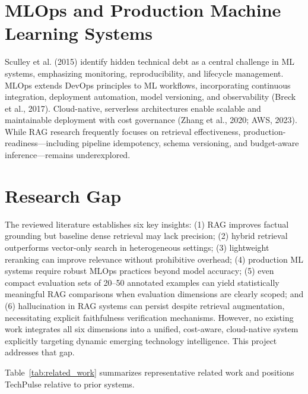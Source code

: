 \documentclass[12pt,a4paper]{report}
\begin{document}
\section{MLOps and Production Machine Learning Systems}
\label{sec:lit_mlops}

Sculley et al. (2015) identify hidden technical debt as a central challenge in ML systems, emphasizing monitoring, reproducibility, and lifecycle management. MLOps extends DevOps principles to ML workflows, incorporating continuous integration, deployment automation, model versioning, and observability (Breck et al., 2017). Cloud-native, serverless architectures enable scalable and maintainable deployment with cost governance (Zhang et al., 2020; AWS, 2023). While RAG research frequently focuses on retrieval effectiveness, production-readiness---including pipeline idempotency, schema versioning, and budget-aware inference---remains underexplored.

\section{Research Gap}
\label{sec:gap}

The reviewed literature establishes six key insights: (1) RAG improves factual grounding but baseline dense retrieval may lack precision; (2) hybrid retrieval outperforms vector-only search in heterogeneous settings; (3) lightweight reranking can improve relevance without prohibitive overhead; (4) production ML systems require robust MLOps practices beyond model accuracy; (5) even compact evaluation sets of 20--50 annotated examples can yield statistically meaningful RAG comparisons when evaluation dimensions are clearly scoped; and (6) hallucination in RAG systems can persist despite retrieval augmentation, necessitating explicit faithfulness verification mechanisms. However, no existing work integrates all six dimensions into a unified, cost-aware, cloud-native system explicitly targeting dynamic emerging technology intelligence. This project addresses that gap.

Table~\ref{tab:related_work} summarizes representative related work and positions TechPulse relative to prior systems.
\end{document}

